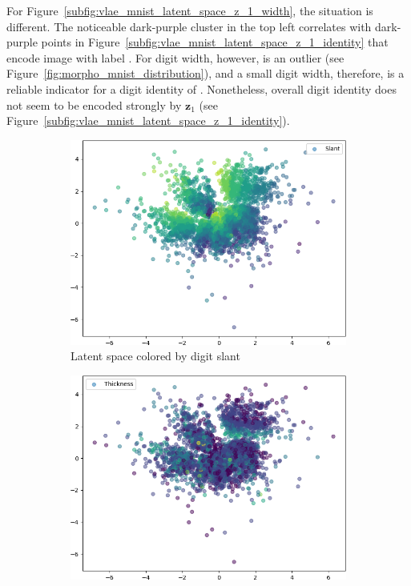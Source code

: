 For Figure~\ref{subfig:vlae_mnist_latent_space_z_1_width}, the situation is different.
The noticeable dark-purple cluster in the top left correlates with dark-purple points in Figure~\ref{subfig:vlae_mnist_latent_space_z_1_identity} that encode image with label .
For digit width, however,  is an outlier (see Figure~\ref{fig:morpho_mnist_distribution}), and a small digit width, therefore, is a reliable indicator for a digit identity of .
Nonetheless, overall digit identity does not seem to be encoded strongly by $\bm{z}_1$ (see Figure~\ref{subfig:vlae_mnist_latent_space_z_1_identity}).

\begin{figure}
    \centering
    \begin{subfigure}{.32\textwidth}
        \includegraphics[width=\textwidth]{images/latent_spaces/mnist/vae/embeddings_mu_0.png}
        \caption{Latent space colored by digit slant}
        \label{subfig:vae_mnist_latent_space_slant}
    \end{subfigure}
    \hfill
    \begin{subfigure}{.32\textwidth}
        \includegraphics[width=\textwidth]{images/latent_spaces/mnist/vae/embeddings_mu_1.png}

\end{subfigure}
\end{figure}
